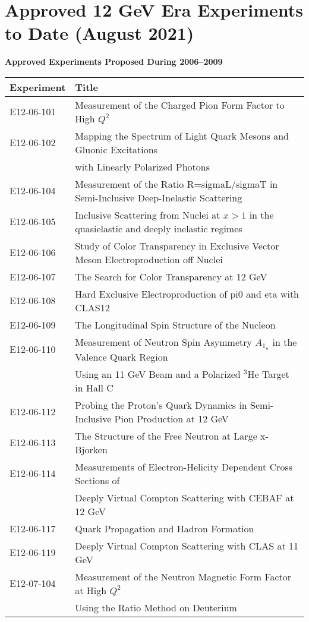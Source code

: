 \clearpage
\section{Approved 12 GeV Era Experiments to Date (August 2021)}
\label{sec:appendixe}

\centerline{\bf Approved Experiments Proposed During 2006--2009}
\begin{tabular}{ll}
Experiment & Title\\
\hline
E12-06-101 & Measurement of the Charged Pion Form Factor to High $Q^2$\\
E12-06-102 & Mapping the Spectrum of Light Quark Mesons and Gluonic Excitations\\
& with Linearly Polarized Photons\\
E12-06-104 & Measurement of the Ratio R=sigmaL/sigmaT in Semi-Inclusive Deep-Inelastic Scattering\\
E12-06-105 & Inclusive Scattering from Nuclei at $x >1$ in the quasielastic and deeply inelastic regimes\\
E12-06-106 & Study of Color Transparency in Exclusive Vector Meson Electroproduction off Nuclei\\
E12-06-107 & The Search for Color Transparency at 12 GeV\\
E12-06-108 & Hard Exclusive Electroproduction of pi0 and eta with CLAS12\\
E12-06-109 & The Longitudinal Spin Structure of the Nucleon\\
E12-06-110 & Measurement of Neutron Spin Asymmetry $A_{1_n}$ in the Valence Quark Region\\
& Using an 11 GeV Beam and a Polarized $^3$He Target in Hall C\\
E12-06-112 & Probing the Proton's Quark Dynamics in Semi-Inclusive Pion Production at 12 GeV\\
E12-06-113 & The Structure of the Free Neutron at Large x-Bjorken\\
E12-06-114 & Measurements of Electron-Helicity Dependent Cross Sections of\\
& Deeply Virtual Compton Scattering with CEBAF at 12 GeV\\
E12-06-117 & Quark Propagation and Hadron Formation\\
E12-06-119 & Deeply Virtual Compton Scattering with CLAS at 11 GeV\\
E12-07-104 & Measurement of the Neutron Magnetic Form Factor at High $Q^2$\\
& Using the Ratio Method on Deuterium\\

\end{tabular}

